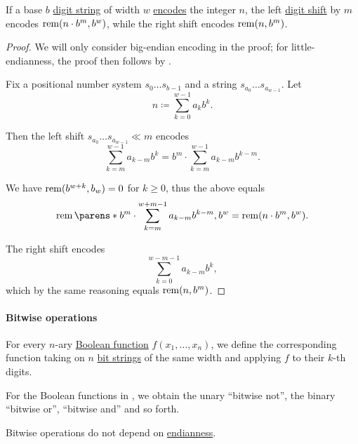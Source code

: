 \begin{proposition}\label{thm:digit_shift_arithmetic}
  If a base \( b \) \hyperref[def:positional_number_system]{digit string} of width \( w \) \hyperref[def:fixed_width_nonnegative_integer_encoding]{encodes} the integer \( n \), the left \hyperref[def:digit_shift]{digit shift} by \( m \) encodes \( \operatorname{rem}(n \cdot b^m, b^w) \), while the right shift encodes \( \operatorname{rem}(n, b^m) \).
\end{proposition}
\begin{proof}
  We will only consider big-endian encoding in the proof; for little-endianness, the proof then follows by .

  Fix a positional number system \( s_0 \ldots s_{b-1} \) and a string \( s_{a_0} \ldots s_{a_{w-1}} \). Let
  \begin{equation*}
    n \coloneqq \sum_{k=0}^{w-1} a_k b^k.
  \end{equation*}

  Then the left shift \( s_{a_0} \ldots s_{a_{w-1}} \ll m \) encodes
  \begin{equation*}
    \sum_{k=m}^{w-1} a_{k-m} b^k = b^m \cdot \sum_{k=m}^{w-1} a_{k-m} b^{k-m}.
  \end{equation*}

  We have \( \operatorname{rem}(b^{w+k}, b_w) = 0 \) for \( k \geq 0 \), thus the above equals
  \begin{equation*}
    \rem\parens*{ b^m \cdot \sum_{k=m}^{w+m-1} a_{k-m} b^{k-m}, b^w } = \rem(n \cdot b^m, b^w).
  \end{equation*}

  The right shift encodes
  \begin{equation*}
    \sum_{k=0}^{w-m-1} a_{k-m} b^k,
  \end{equation*}
  which by the same reasoning equals \( \operatorname{rem}(n, b^m) \).
\end{proof}

\paragraph{Bitwise operations}

\begin{definition}\label{def:bitwise_operations}
  For every \( n \)-ary \hyperref[def:boolean_function]{Boolean function} \( f(x_1, \ldots, x_n) \), we define the corresponding  function taking on \( n \) \hyperref[def:bit_string]{bit strings} of the same width and applying \( f \) to their \( k \)-th digits.
\end{definition}
\begin{comments}
  \item For the Boolean functions in , we obtain the unary \enquote{bitwise not}, the binary \enquote{bitwise or}, \enquote{bitwise and} and so forth.

  \item Bitwise operations do not depend on \hyperref[def:endianness]{endianness}.
\end{comments}

